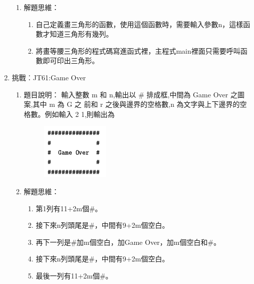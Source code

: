 \begin{enumerate}
\begin{enumerate}
			\item 解題思維：
			\begin{enumerate}
				\item 自己定義畫三角形的函數，使用這個函數時，需要輸入參數n，這樣函數才知道三角形有幾列。
				\item 將畫等腰三角形的程式碼寫進函式裡，主程式main裡面只需要呼叫函數即可印出三角形。
			\end{enumerate}

		\end{enumerate}
		
	
	
	\item 挑戰︰JT61:Game Over
		\begin{enumerate}
			\item 題目說明：
			\subitem 輸入整數 m 和 n,輸出以 \# 排成框,中間為 Game Over 之圖案,其中 m 為 G 之
			前和 r 之後與邊界的空格數,n 為文字與上下邊界的空格數。例如輸入 2 1,則輸出為
			\begin{figure}[h]
			\centering
			\includegraphics{fig/game_over_fig}
			\end{figure}
			\item 解題思維：
			\begin{enumerate}
				\item 第1列有11+2m個\#。
				\item 接下來n列頭尾是\#，中間有9+2m個空白。
				\item 再下一列是\#加m個空白，加Game Over，加m個空白和\#。
				\item 接下來n列頭尾是\#，中間有9+2m個空白。
				\item 最後一列有11+2m個\#。
			\end{enumerate}

\end{enumerate}
\end{enumerate}
